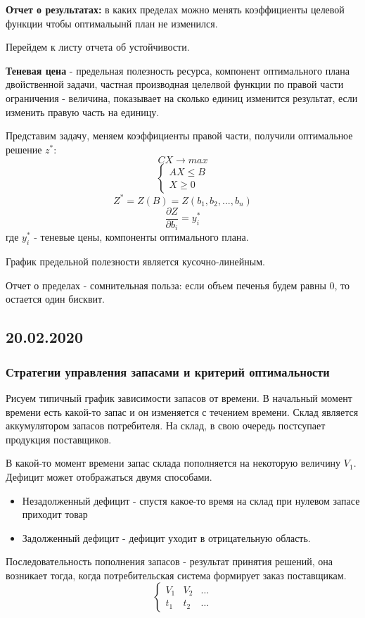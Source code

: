 \documentclass[aps,%
12pt,%
final,%
oneside,
onecolumn,%
musixtex, %
superscriptaddress,%
centertags]{article} %
\begin{document}
\textbf{Отчет о результатах:} в каких пределах можно менять коэффициенты целевой функции чтобы оптимальынй план не изменился.

Перейдем к листу отчета об устойчивости.

\textbf{Теневая цена} - предельная полезность ресурса, компонент оптимального плана двойственной задачи, частная производная целелвой функции по правой части ограничения - величина, показывает на сколько единиц изменится результат, если изменить правую часть на единицу.

Представим задачу, меняем коэффициенты правой части, получили оптимальное решение $z^{*}$:
$$CX \to max$$
$$ \left\{
\begin{matrix}
AX \leq B \\ 
X \geq 0
\end{matrix}\right. $$
$$ Z^{*} = Z(B) = Z(b_1,b_2,...,b_n)$$
$$ \frac{\partial Z}{\partial b_i} =y_i^*$$
где $y_i^*$ - теневые цены, компоненты оптимального плана.

График предельной полезности является кусочно-линейным.

Отчет о пределах - сомнительная польза: если объем печенья будем равны $0$, то остается один бисквит.

\subsection{20.02.2020}
\subsubsection{Стратегии управления запасами и критерий оптимальности}

Рисуем типичный график зависимости запасов от времени. В начальный момент времени есть какой-то запас и он изменяется с течением времени. Склад является аккумулятором запасов потребителя. На склад, в свою очередь постсупает продукция поставщиков.

В какой-то момент времени запас склада пополняется на некоторую величину $V_1$.
Дефицит может отображаться двумя способами. 
\begin{itemize}
	\item Незадолженный дефицит - спустя какое-то время на склад при нулевом запасе приходит товар
	\item Задолженный дефицит - дефицит уходит в отрицательную область.
\end{itemize}

Последовательность пополнения запасов - результат принятия решений, она возникает тогда, когда потребительская система формирует заказ поставщикам.
$$ \left\{
\begin{matrix}
V_1 & V_2 & \ldots \\
t_1 & t_2 & \ldots
\end{matrix} \right.$$
\end{document}
